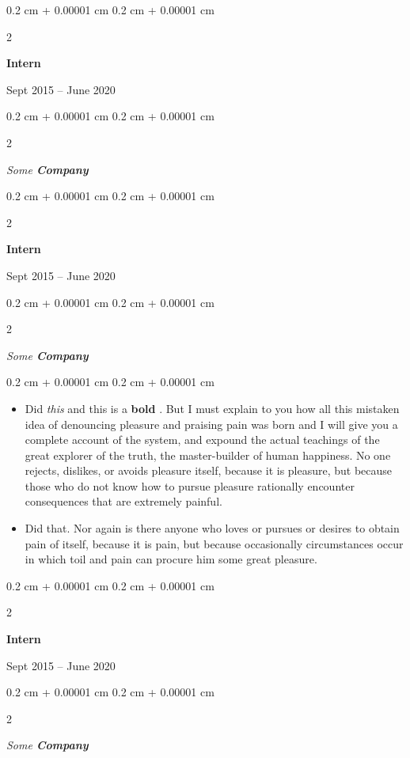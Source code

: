 \documentclass[10pt, letterpaper]{article}
\newenvironment{highlights}{
    \begin{itemize}[
        topsep=0.10 cm,
        parsep=0.10 cm,
        partopsep=0pt,
        itemsep=0pt,
        leftmargin=0.4 cm + 10pt
    ]
}{
    \end{itemize}
} %
\newenvironment{onecolentry}{
    \begin{adjustwidth}{
        0.2 cm + 0.00001 cm
    }{
        0.2 cm + 0.00001 cm
    }
}{
    \end{adjustwidth}
} %
\newenvironment{twocolentry}[2][]{
    \onecolentry
    \def\secondColumn{#2}
    \setcolumnwidth{\fill, 4.5 cm}
    \begin{paracol}{2}
}{
    \switchcolumn \raggedleft \secondColumn
    \end{paracol}
    \endonecolentry
} %
\let\hrefWithoutArrow\href
\renewcommand{\href}[2]{\hrefWithoutArrow{#1}{\ifthenelse{\equal{#2}{}}{ }{#2 }\raisebox{.15ex}{\footnotesize \faExternalLink*}}}
\begin{document}
                \begin{twocolentry}{
                    Sept 2015 – June 2020
                }
                \textbf{Intern}
                \end{twocolentry}
            \begin{twocolentry}{
            }
            \textit{Some \textbf{Company}}
            \end{twocolentry}



        \vspace{0.2 cm}

                \begin{twocolentry}{
                    Sept 2015 – June 2020
                }
                \textbf{Intern}
                \end{twocolentry}
            \begin{twocolentry}{
            }
            \textit{Some \textbf{Company}}
            \end{twocolentry}

        \vspace{0.10 cm}
        \begin{onecolentry}
            \begin{highlights}
                \item Did \textit{this} and this is a \textbf{bold} \href{https://example.com}{link}. But I must explain to you how all this mistaken idea of denouncing pleasure and praising pain was born and I will give you a complete account of the system, and expound the actual teachings of the great explorer of the truth, the master-builder of human happiness. No one rejects, dislikes, or avoids pleasure itself, because it is pleasure, but because those who do not know how to pursue pleasure rationally encounter consequences that are extremely painful.
                \item Did that. Nor again is there anyone who loves or pursues or desires to obtain pain of itself, because it is pain, but because occasionally circumstances occur in which toil and pain can procure him some great pleasure.
            \end{highlights}
        \end{onecolentry}


        \vspace{0.2 cm}

                \begin{twocolentry}{
                    Sept 2015 – June 2020
                }
                \textbf{Intern}
                \end{twocolentry}
            \begin{twocolentry}{
            }
            \textit{Some \textbf{Company}}
            \end{twocolentry}
\end{document}
